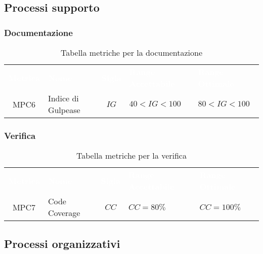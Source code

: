 \subsection{Processi supporto}

\subsubsection{Documentazione}
    \renewcommand{\arraystretch}{1.5}
    \begin{longtable}{ c C{4cm} c C{3.5cm} C{3.5cm}}
    	\caption{Tabella metriche per la documentazione}\\
    	\textcolor{white}{\textbf{Metrica}} & \textcolor{white}{\textbf{Nome}} & \textcolor{white}{\textbf{Sigla}} & \textcolor{white}{\textbf{Range Accettabile}} & \textcolor{white}{\textbf{Range Ottimale}}\\
    	MPC6 & Indice di Gulpease & $IG$ & $40 < IG < 100$ & $80 < IG < 100$ \\
    \end{longtable}
\vspace{0.3cm}
\subsubsection{Verifica}
    \renewcommand{\arraystretch}{1.5}
    \begin{longtable}{ c C{4cm} c C{3.5cm} C{3.5cm}}
    	\caption{Tabella metriche per la verifica}\\
    	\textcolor{white}{\textbf{Metrica}} & \textcolor{white}{\textbf{Nome}} & \textcolor{white}{\textbf{Sigla}} & \textcolor{white}{\textbf{Range Accettabile}} & \textcolor{white}{\textbf{Range Ottimale}}\\
    	MPC7 & Code Coverage & $CC$ & $CC = 80\%$ & $CC = 100\%$  \\
    \end{longtable}
\vspace{0.3cm}
\subsection{Processi organizzativi}

